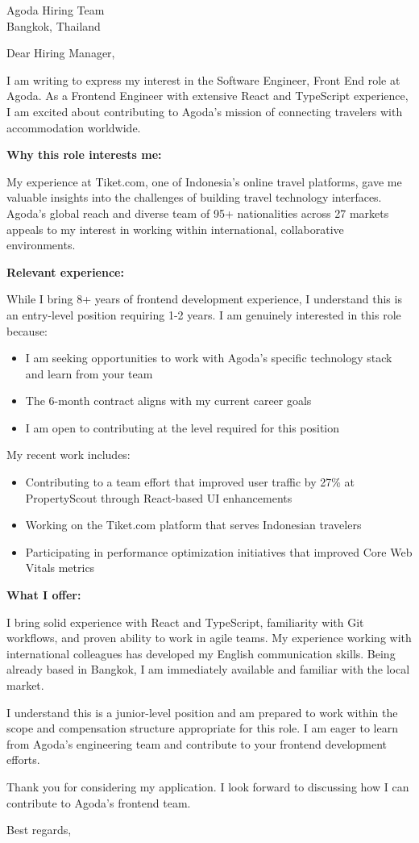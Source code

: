 \documentclass[11pt,a4paper]{letter}
\begin{document}
\begin{letter}{Agoda Hiring Team \\ Bangkok, Thailand}

\opening{Dear Hiring Manager,}

I am writing to express my interest in the Software Engineer, Front End role at Agoda. As a Frontend Engineer with extensive React and TypeScript experience, I am excited about contributing to Agoda's mission of connecting travelers with accommodation worldwide.

\textbf{Why this role interests me:}

My experience at Tiket.com, one of Indonesia's online travel platforms, gave me valuable insights into the challenges of building travel technology interfaces. Agoda's global reach and diverse team of 95+ nationalities across 27 markets appeals to my interest in working within international, collaborative environments.

\textbf{Relevant experience:}

While I bring 8+ years of frontend development experience, I understand this is an entry-level position requiring 1-2 years. I am genuinely interested in this role because:
\begin{itemize}
    \item I am seeking opportunities to work with Agoda's specific technology stack and learn from your team
    \item The 6-month contract aligns with my current career goals
    \item I am open to contributing at the level required for this position
\end{itemize}

My recent work includes:
\begin{itemize}
    \item Contributing to a team effort that improved user traffic by 27\% at PropertyScout through React-based UI enhancements
    \item Working on the Tiket.com platform that serves Indonesian travelers
    \item Participating in performance optimization initiatives that improved Core Web Vitals metrics
\end{itemize}

\textbf{What I offer:}

I bring solid experience with React and TypeScript, familiarity with Git workflows, and proven ability to work in agile teams. My experience working with international colleagues has developed my English communication skills. Being already based in Bangkok, I am immediately available and familiar with the local market.

I understand this is a junior-level position and am prepared to work within the scope and compensation structure appropriate for this role. I am eager to learn from Agoda's engineering team and contribute to your frontend development efforts.

Thank you for considering my application. I look forward to discussing how I can contribute to Agoda's frontend team.

\closing{Best regards,}

\end{letter}
\end{document}
